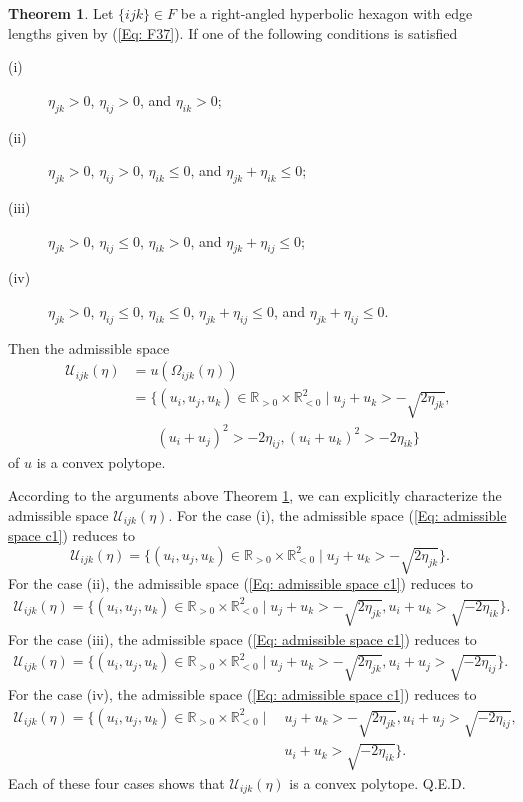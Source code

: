 \documentclass[12pt]{amsart}
\theoremstyle{definition}
\newtheorem{theorem}{Theorem}[section]
\def\qed{\hfill{Q.E.D.}\smallskip}
\begin{document}
\begin{theorem}\label{Thm: ASC 2}
Let $\{ijk\}\in F$ be a right-angled hyperbolic  hexagon with edge lengths given by (\ref{Eq: F37}).
If one of the following conditions is satisfied
\begin{description}
\item[(i)] $\eta_{jk}>0$, $\eta_{ij}>0$, and $\eta_{ik}>0$;
\item[(ii)] $\eta_{jk}>0$, $\eta_{ij}>0$, $\eta_{ik}\leq0$, and $\eta_{jk}+\eta_{ik}\leq0$;
\item[(iii)] $\eta_{jk}>0$, $\eta_{ij}\leq0$, $\eta_{ik}>0$, and $\eta_{jk}+\eta_{ij}\leq0$;
\item[(iv)] $\eta_{jk}>0$, $\eta_{ij}\leq0$, $\eta_{ik}\leq0$, $\eta_{jk}+\eta_{ij}\leq0$, and $\eta_{jk}+\eta_{ij}\leq0$.
\end{description}
Then the admissible space
\begin{equation}\label{Eq: admissible space c1}
\begin{aligned}
\mathcal{U}_{ijk}(\eta)
&=u(\Omega_{ijk}(\eta))\\
&=\{(u_i,u_j,u_k)\in \mathbb{R}_{>0}\times\mathbb{R}_{<0}^2 \mid u_j+u_k>-\sqrt{2\eta_{jk}},\ \\
&\ \ \ \ \ \ \ \ (u_i+u_j)^2>-2\eta_{ij}, (u_i+u_k)^2>-2\eta_{ik} \}
\end{aligned}
\end{equation}
of $u$ is a convex polytope.
\end{theorem}
\proof
According to the arguments above Theorem \ref{Thm: ASC 2}, we can explicitly characterize the admissible space $\mathcal{U}_{ijk}(\eta)$.
For the case (i), the admissible space (\ref{Eq: admissible space c1}) reduces to
\begin{equation*}
\mathcal{U}_{ijk}(\eta)
=\{(u_i,u_j,u_k)\in \mathbb{R}_{>0}\times\mathbb{R}_{<0}^2 \mid u_j+u_k>-\sqrt{2\eta_{jk}} \}.
\end{equation*}
For the case (ii), the admissible space (\ref{Eq: admissible space c1}) reduces to
\begin{align*}
\mathcal{U}_{ijk}(\eta)
=\{(u_i,u_j,u_k)\in \mathbb{R}_{>0}\times\mathbb{R}_{<0}^2 \mid u_j+u_k>-\sqrt{2\eta_{jk}}, u_i+u_k>\sqrt{-2\eta_{ik}} \}.
\end{align*}
For the case (iii), the admissible space (\ref{Eq: admissible space c1}) reduces to
\begin{align*}
\mathcal{U}_{ijk}(\eta)
=\{(u_i,u_j,u_k)\in \mathbb{R}_{>0}\times\mathbb{R}_{<0}^2 \mid u_j+u_k>-\sqrt{2\eta_{jk}}, u_i+u_j>\sqrt{-2\eta_{ij}} \}.
\end{align*}
For the case (iv), the admissible space (\ref{Eq: admissible space c1}) reduces to
\begin{align*}
\mathcal{U}_{ijk}(\eta)
=\{(u_i,u_j,u_k)\in \mathbb{R}_{>0}\times\mathbb{R}_{<0}^2 \mid &\ u_j+u_k>-\sqrt{2\eta_{jk}}, u_i+u_j>\sqrt{-2\eta_{ij}}, \\ &\ u_i+u_k>\sqrt{-2\eta_{ik}} \}.
\end{align*}
Each of these four cases shows that $\mathcal{U}_{ijk}(\eta)$ is a convex polytope.
\qed
\end{document}
